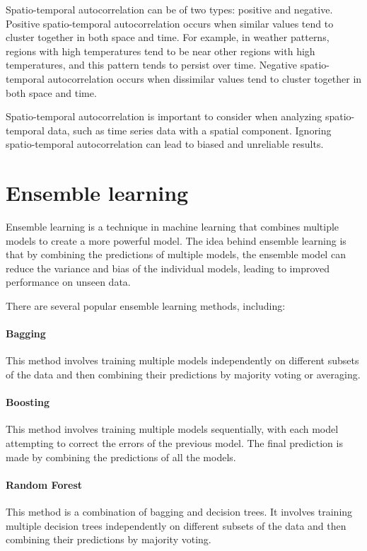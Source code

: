 Spatio-temporal autocorrelation can be of two types: positive and negative. 
Positive spatio-temporal autocorrelation occurs when similar values tend to cluster together in both space and time. 
For example, in weather patterns, regions with high temperatures tend to be near other regions with high temperatures, and this pattern tends to persist over time. 
Negative spatio-temporal autocorrelation occurs when dissimilar values tend to cluster together in both space and time.

Spatio-temporal autocorrelation is important to consider when analyzing spatio-temporal data, such as time series data with a spatial component.
Ignoring spatio-temporal autocorrelation can lead to biased and unreliable results.

\section{Ensemble learning}
Ensemble learning \cite{Ho2009, Sklansky2013} is a technique in machine learning that combines multiple models to create a more powerful model.
The idea behind ensemble learning is that by combining the predictions of multiple models, the ensemble model can reduce the variance and bias of the individual models, leading to improved performance on unseen data.

There are several popular ensemble learning methods, including:

\paragraph{Bagging} This method involves training multiple models independently on different subsets of the data and then combining their predictions by majority voting or averaging.

\paragraph{Boosting} This method involves training multiple models sequentially, with each model attempting to correct the errors of the previous model. The final prediction is made by combining the predictions of all the models.

\paragraph{Random Forest} This method is a combination of bagging and decision trees. It involves training multiple decision trees independently on different subsets of the data and then combining their predictions by majority voting.

